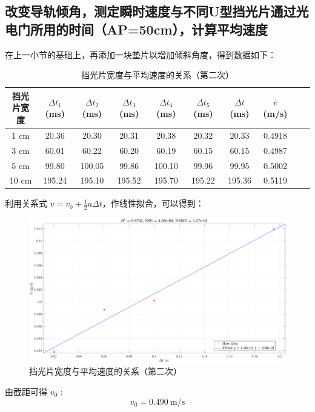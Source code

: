\documentclass[UTF8]{article}
\theoremstyle{MyLineTheoremStyle} %
\theoremstyle{MyBlockTheoremStyle} %
\theoremstyle{MySubsubsectionStyle} %
\begin{document}
\subsection{改变导轨倾角，测定瞬时速度与不同U型挡光片通过光电门所用的时间（AP=50cm），计算平均速度}
在上一小节的基础上，再添加一块垫片以增加倾斜角度，得到数据如下：
\begin{table}[H]\centering
    \caption{挡光片宽度与平均速度的关系（第二次）}
\begin{tabular}{cccccccccc}\toprule
    挡光片宽度 & $\Delta t_1$ (ms) & $\Delta t_2$ (ms) & $\Delta t_3$ (ms) & $\Delta t_4$ (ms) & $\Delta t_5$ (ms) & $\overline{\Delta t}$ (ms) & $\overline{v}$ (m/s)  \\
    \midrule
    1 cm   &20.36	&20.30	&20.31	&20.38	&20.32	&20.33	&0.4918 \\
    3  cm  &60.01	&60.22	&60.20	&60.19	&60.15	&60.15	&0.4987 \\
    5  cm  &99.80	&100.05	&99.86	&100.10	&99.96	&99.95	&0.5002 \\
    10  cm &195.24	&195.10	&195.52	&195.70	&195.22	&195.36	&0.5119 \\
    \bottomrule
\end{tabular}
\end{table}
利用关系式 $\overline{v} = v_0 + \frac{1}{2}a \Delta t$，作线性拟合，可以得到：
\begin{figure}[H]\centering
    \includegraphics[width=0.9\columnwidth]{assets/9.pdf}
    \caption{挡光片宽度与平均速度的关系（第二次）}
\end{figure}
由截距可得 $v_0$ : 
\begin{equation}
v_0 = 0.490 \ \mathrm{m/s}
\end{equation}
\end{document}
